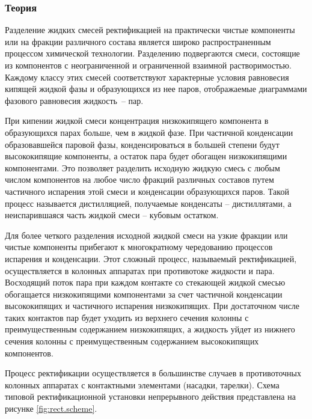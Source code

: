 

\subsubsection{Теория}
Разделение жидких смесей ректификацией на практически чистые компоненты или на фракции различного состава является широко распространенным процессом химической технологии. Разделению подвергаются смеси, состоящие из компонентов с неограниченной и ограниченной взаимной растворимостью. Каждому классу этих смесей соответствуют характерные условия равновесия кипящей жидкой фазы и образующихся из нее паров, отображаемые диаграммами фазового равновесия жидкость~-- пар.

При кипении жидкой смеси концентрация низкокипящего компонента в образующихся парах больше, чем в жидкой фазе. При частичной конденсации образовавшейся паровой фазы, конденсироваться в большей степени будут высококипящие компоненты, а остаток пара будет обогащен низкокипящими компонентами. Это позволяет разделить исходную жидкую смесь с любым числом компонентов на любое число фракций различных составов путем частичного испарения этой смеси и конденсации образующихся паров. Такой процесс называется дистилляцией, получаемые конденсаты – дистиллятами, а неиспарившаяся часть жидкой смеси – кубовым остатком. 

Для более четкого разделения исходной жидкой смеси на узкие фракции или чистые компоненты прибегают к многократному чередованию процессов испарения и конденсации. Этот сложный процесс, называемый ректификацией, осуществляется в колонных аппаратах при противотоке жидкости и пара. Восходящий поток пара при каждом контакте со стекающей жидкой смесью обогащается низкокипящими компонентами за счет частичной конденсации высококипящих и частичного испарения низкокипящих. При достаточном числе таких контактов пар будет уходить из верхнего сечения колонны с преимущественным содержанием низкокипящих, а жидкость уйдет из нижнего сечения колонны с преимущественным содержанием высококипящих компонентов.

Процесс ректификации осуществляется в большинстве случаев в противоточных колонных аппаратах с контактными элементами (насадки, тарелки). Схема типовой ректификационной установки непрерывного действия представлена на рисунке \ref{fig:rect.scheme}.

